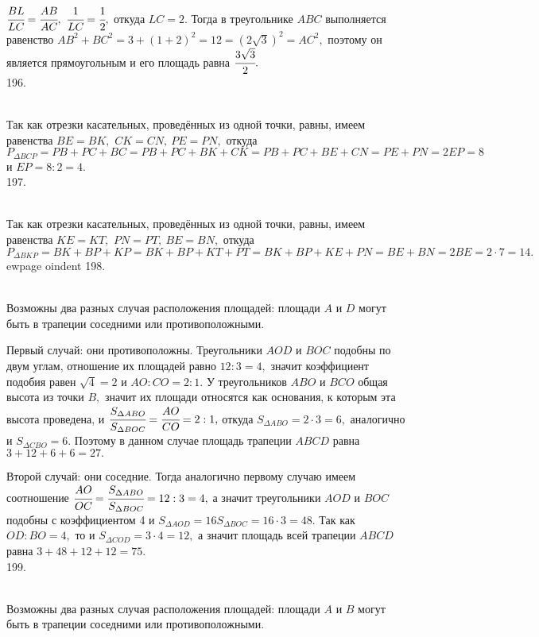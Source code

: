 $\cfrac{BL}{LC}=\cfrac{AB}{AC},\ \cfrac{1}{LC}=\cfrac{1}{2},$ откуда $LC=2.$ Тогда в треугольнике $ABC$ выполняется равенство $AB^2+BC^2=3+(1+2)^2=12=(2\sqrt{3})^2=AC^2,$ поэтому он является прямоугольным и его площадь равна $\cfrac{3\sqrt{3}}{2}.$\\
196. \begin{figure}[ht!]
\end{figure}\\
Так как отрезки касательных, проведённых из одной точки, равны, имеем равенства $BE=BK,$ $CK=CN,\ PE=PN,$ откуда $P_{\Delta BCP}=PB+PC+BC=PB+PC+BK+CK=
PB+PC+BE+CN=PE+PN=2EP=8$ и $EP=8:2=4.$\\
197. \begin{figure}[ht!]
\end{figure}\\
Так как отрезки касательных, проведённых из одной точки, равны, имеем равенства $KE=KT,$ $PN=PT,\ BE=BN,$ откуда $P_{\Delta BKP}=BK+BP+KP=BK+BP+KT+PT=
BK+BP+KE+PN=BE+BN=2BE=2\cdot7=14.$
ewpage
oindent
198. \begin{figure}[ht!]
\end{figure}\\
Возможны два разных случая расположения площадей: площади $A$ и $D$ могут быть в трапеции соседними или противоположными.

Первый случай: они противоположны. Треугольники $AOD$ и $BOC$ подобны по двум углам, отношение их площадей равно $12:3=4,$ значит коэффициент подобия равен $\sqrt{4}=2$ и $AO:CO=2:1.$ У треугольников $ABO$ и $BCO$ общая высота из точки $B,$ значит их площади относятся как основания, к которым эта высота проведена, и $\cfrac{S_{\Delta ABO}}{S_{\Delta BOC}}=\cfrac{AO}{CO}=2:1,$ откуда $S_{\Delta ABO}=2\cdot3=6,$ аналогично и $S_{\Delta CBO}=6.$ Поэтому в данном случае площадь трапеции $ABCD$ равна $3+12+6+6=27.$

Второй случай: они соседние. Тогда аналогично первому случаю имеем соотношение $\cfrac{AO}{OC}=\cfrac{S_{\Delta ABO}}{S_{\Delta BOC}}=12:3=4,$ а значит треугольники $AOD$ и $BOC$ подобны с коэффициентом 4 и $S_{\Delta AOD}=16S_{\Delta BOC}=16\cdot3=48.$ Так как $OD:BO=4,$ то и $S_{\Delta COD}=3\cdot4=12,$ а значит площадь всей трапеции $ABCD$ равна $3+48+12+12=75.$\\
199. \begin{figure}[ht!]
\end{figure}\\
Возможны два разных случая расположения площадей: площади $A$ и $B$ могут быть в трапеции соседними или противоположными.


